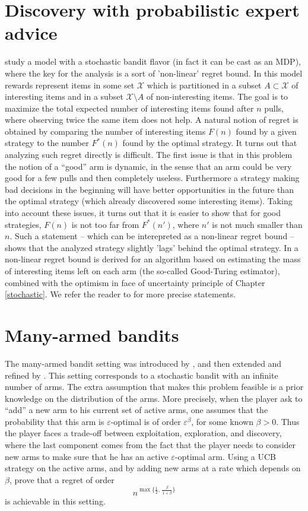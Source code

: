 \documentclass[11pt]{hackednow}
\newcommand{\cX}{\mathcal{X}}
\renewcommand{\epsilon}{\varepsilon}
\begin{document}
\section{Discovery with probabilistic expert advice}
\cite{BEG11} study a model with a stochastic bandit flavor (in fact it can be cast as an MDP), where the key for the analysis is a sort of 'non-linear' regret bound.
In this model rewards represent items in some set $\cX$ which is partitioned in a subset  $A \subset \cX$ of interesting items and in a subset $\cX\setminus A$ of non-interesting items. The goal is to maximize the total expected number of interesting items found after $n$ pulls, where observing twice the same item does not help. A natural notion of regret is obtained by comparing the number of interesting items $F(n)$ found by a given strategy to the number $F^*(n)$ found by the optimal strategy. It turns out that analyzing such regret directly is difficult. The first issue is that in this problem the notion of a ``good'' arm is dynamic, in the sense that an arm could be very good for a few pulls and then completely useless. Furthermore a strategy making bad decisions in the beginning will have better opportunities in the future than the optimal strategy (which already discovered some interesting items). Taking into account these issues, it turns out that it is easier to show that for good strategies, $F(n)$ is not too far from $F^*(n')$, where $n'$ is not much smaller than $n$. Such a statement -- which can be interepreted as a non-linear regret bound -- shows that the analyzed strategy slightly 'lags' behind the optimal strategy. In \cite{BEG11} a non-linear regret bound is derived for an algorithm based on estimating the mass of interesting items left on each arm (the so-called Good-Turing estimator), combined with the optimism in face of uncertainty principle of Chapter \ref{stochastic}. We refer the reader to \cite{BEG11} for more precise statements.


\section{Many-armed bandits}
The many-armed bandit setting was introduced by \cite{BCZHS97}, and then extended and refined by \cite{WAM08}. This setting corresponds to a stochastic bandit with an infinite number of arms. The extra assumption that makes this problem feasible is a prior knowledge on the distribution of the arms. More precisely, when the player ask to ``add'' a new arm to his current set of active arms, one assumes that the probability that this arm is $\epsilon$-optimal is of order $\epsilon^{\beta}$, for some known $\beta > 0$. Thus the player faces a trade-off between exploitation, exploration, and discovery, where the last component comes from the fact that the player needs to consider new arms to make sure that he has an active $\epsilon$-optimal arm. Using a UCB strategy on the active arms, and by adding new arms at a rate which depends on $\beta$, \cite{WAM08} prove that a regret of order
\[
    n^{\max \bigl\{\frac12,\, \frac{\beta}{1+\beta}\bigr\}}
\]
is achievable in this setting.
\end{document}
